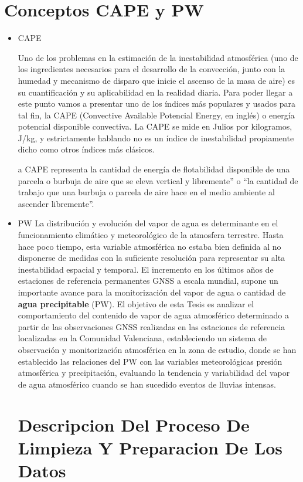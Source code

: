 \documentclass{article}
\begin{document}
\section{Conceptos CAPE y PW}
\begin{itemize}
\item CAPE

Uno de los problemas en la estimación de la inestabilidad atmosférica (uno de los ingredientes necesarios para el desarrollo de la convección, junto con la humedad y mecanismo de disparo que inicie el ascenso de la masa de aire) es su cuantificación y su aplicabilidad en la realidad diaria. Para poder llegar a este punto vamos a presentar uno de los índices más populares y usados para tal fin, la CAPE (Convective Available Potencial Energy, en inglés) o energía potencial disponible convectiva.  La CAPE se mide en Julios por kilogramos, J/kg, y estrictamente hablando no es un índice de inestabilidad propiamente dicho como otros índices más clásicos.

a CAPE representa la cantidad de energía de flotabilidad disponible de una parcela o burbuja de aire  que se eleva vertical y libremente” o “la cantidad de  trabajo que una burbuja o parcela de aire hace en el medio ambiente al ascender libremente”.

\item{PW}
La distribución y evolución del vapor de agua es determinante en el funcionamiento climático y meteorológico de la atmosfera terrestre. Hasta hace poco tiempo, esta variable atmosférica no estaba bien definida al no disponerse de medidas con la suficiente resolución para representar su alta inestabilidad espacial y temporal. El incremento en los últimos años de estaciones de referencia permanentes GNSS a escala mundial, supone un importante avance para la monitorización del vapor de agua o cantidad de \textbf{agua precipitable} (PW). El objetivo de esta Tesis es analizar el comportamiento del contenido de vapor de agua atmosférico determinado a partir de las observaciones GNSS realizadas en las estaciones de referencia localizadas en la Comunidad Valenciana, estableciendo un sistema de observación y monitorización atmosférica en la zona de estudio, donde se han establecido las relaciones del PW con las variables meteorológicas presión atmosférica y precipitación, evaluando la tendencia y variabilidad del vapor de agua atmosférico cuando se han sucedido eventos de lluvias intensas.

\section{Descripcion Del Proceso De Limpieza Y Preparacion De Los Datos}


\end{itemize}
\end{document}
